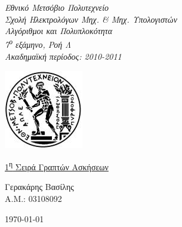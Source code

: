 \begin{titlepage}
\begin{center}

\noindent\begin{minipage}[b]{.60\textwidth}
\begin{Large}
\emph{Εθνικό Μετσόβιο Πολυτεχνείο\\
Σχολή Ηλεκτρολόγων Μηχ. \& Μηχ. Υπολογιστών \\
Αλγόριθμοι και Πολυπλοκότητα\\
7\textsuperscript{ο} εξάμηνο, Ροή Λ\\
Ακαδημαϊκή περίοδος: 2010-2011\\}
\end{Large}
\end{minipage}%
\begin{minipage}[b]{.40\textwidth}
     \centering
     \includegraphics[scale=0.8]{title/ntua_logo}
\end{minipage}

\vspace{5cm}
\begin{Huge}
\underline{1\textsuperscript{η} Σειρά Γραπτών Ασκήσεων}
\end{Huge}
\vfill

\begin{flushright}
\Large{Γερακάρης Βασίλης}\\
\large{Α.Μ.: 03108092}\\
\end{flushright}
\vspace{1cm}

\large\today\\
\end{center}
\end{titlepage}

